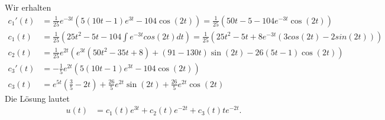 \documentclass[9pt]{extarticle}
\theoremstyle{named}
\begin{document}
Wir erhalten
\begin{align*}
	c_1'(t) &= \frac{1}{25} e^{-3t}(5(10t-1)e^{3t} - 104 \cos(2t)) = \frac{1}{25}(50t-5 - 104e^{-3t}\cos(2t)) \\
	c_1(t) &= \frac{1}{25} \left(25t^2 -5t - 104\int e^{-3t}cos(2t) dt\right) = \frac{1}{25} \left(25 t^2 - 5 t + 8 e^{-3 t} (3 cos(2 t) - 2 sin(2 t)) \right) \\
	c_2(t) &= \frac{1}{25}e^{2t}\left( e^{3t}(50t^2-35t+8)+(91-130t)\sin(2t)-26(5t-1)\cos(2t) \right) \\
	c_3'(t) &= -\frac{1}{5}e^{2t}\left( 5(10t-1)e^{3t} - 104\cos(2t) \right) \\
	c_3(t) &= e^{5t}\left( \frac{3}{5} -2t \right) + \frac{26}{5}e^{2t}\sin(2t) + \frac{26}{5}e^{2t}\cos(2t) 
\end{align*}
Die Lösung lautet
\begin{align*}
	u(t) &= c_1(t)e^{3t} + c_2(t)e^{-2t} + c_3(t)te^{-2t}.
\end{align*}
\end{document}
